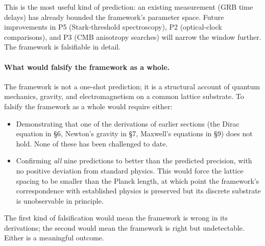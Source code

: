 This is the most useful kind of prediction: an existing measurement
(GRB time delays) has already bounded the framework's parameter
space. Future improvements in P5 (Stark-threshold spectroscopy),
P2 (optical-clock comparisons), and P3 (CMB anisotropy searches)
will narrow the window further. The framework is falsifiable in
detail.

\paragraph{What would falsify the framework as a whole.}
The framework is not a one-shot prediction; it is a structural
account of quantum mechanics, gravity, and electromagnetism on a
common lattice substrate. To falsify the framework as a whole would
require either:

\begin{itemize}
    \item Demonstrating that one of the derivations of earlier
    sections (the Dirac equation in §6, Newton's gravity in §7,
    Maxwell's equations in §9) does not hold. None of these has
    been challenged to date.
    \item Confirming \emph{all} nine predictions to better than
    the predicted precision, with no positive deviation from
    standard physics. This would force the lattice spacing to be
    smaller than the Planck length, at which point the framework's
    correspondence with established physics is preserved but its
    discrete substrate is unobservable in principle.
\end{itemize}

The first kind of falsification would mean the framework is wrong
in its derivations; the second would mean the framework is right
but undetectable. Either is a meaningful outcome.
